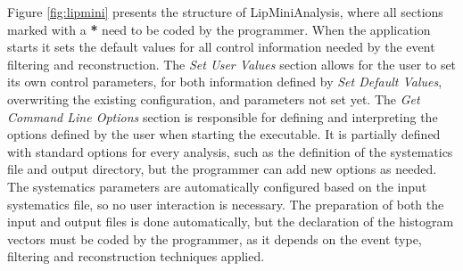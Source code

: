 Figure \ref{fig:lipmini} presents the structure of LipMiniAnalysis, where all sections marked with a \textbf{*} need to be coded by the programmer. When the application starts it sets the default values for all control information needed by the event filtering and reconstruction. The \textit{Set User Values} section allows for the user to set its own control parameters, for both information defined by \textit{Set Default Values}, overwriting the existing configuration, and parameters not set yet. The \textit{Get Command Line Options} section is responsible for defining and interpreting the options defined by the user when starting the executable. It is partially defined with standard options for every analysis, such as the definition of the systematics file and output directory, but the programmer can add new options as needed. The systematics parameters are automatically configured based on the input systematics file, so no user interaction is necessary. The preparation of both the input and output files is done automatically, but the declaration of the histogram vectors must be coded by the programmer, as it depends on the event type, filtering and reconstruction techniques applied.

